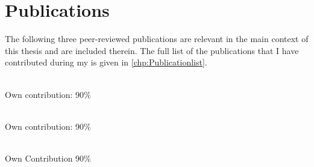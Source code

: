 \noindent
 
\chapter*{Publications}


The following three peer-reviewed publications are relevant in the main context of this thesis and are included therein. The full list of the publications that I have contributed during my is given in \autoref{chp:Publicationlist}.\\


\noindent{}\\ \strut \hfill Own contribution: 90\%\\

\noindent{}\\ \strut \hfill Own contribution: 90\%\\

\noindent{}\\ \strut \hfill Own Contribution 90\%\\


